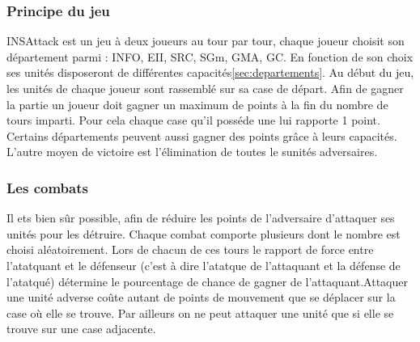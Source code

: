 \subsubsection{Principe du jeu}
INSAttack est un jeu à deux joueurs au tour par tour, chaque joueur choisit son département parmi : INFO, EII, SRC, SGm, GMA, GC. En fonction de son choix ses unités disposeront de différentes capacités\ref{sec:departements}. Au début du jeu, les unités de chaque joueur sont rassemblé sur sa case de départ. Afin de gagner la partie un joueur doit gagner un maximum de points à la fin du nombre de tours imparti. Pour cela chaque case qu'il posséde une lui rapporte 1 point. Certains départements peuvent aussi gagner des points grâce à leurs capacités. L'autre moyen de victoire est l'élimination de toutes le sunités adversaires.

\subsubsection{Les combats}
Il ets bien sûr possible, afin de réduire les points de l'adversaire d'attaquer ses unités pour les détruire. Chaque combat comporte plusieurs dont le nombre est choisi aléatoirement. Lors de chacun de ces tours le rapport de force entre l'atatquant et le défenseur (c'est à dire l'atatque de l'attaquant et la défense de l'atatqué) détermine le pourcentage de chance de gagner de l'attaquant.Attaquer une unité adverse coûte autant de points de mouvement que se déplacer sur la case où elle se trouve. Par ailleurs on ne peut attaquer une unité que si elle se trouve sur une case adjacente. 